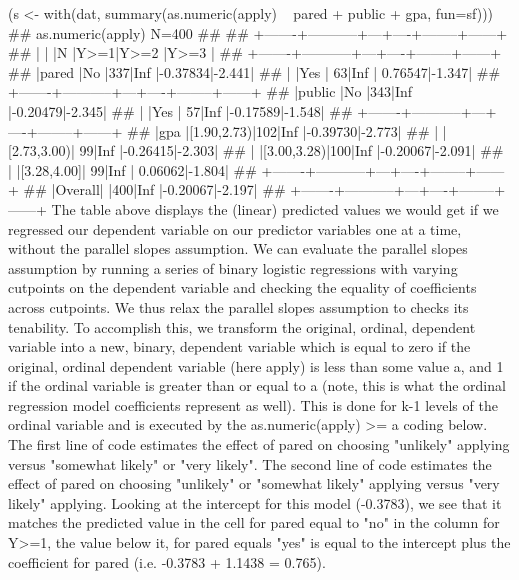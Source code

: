 \documentclass[00-GLMregression.tex]{subfiles}
\begin{document}
(s <- with(dat, summary(as.numeric(apply) ~ pared + public + gpa, fun=sf)))
## as.numeric(apply)    N=400
## 
## +-------+-----------+---+----+--------+------+
## |       |           |N  |Y>=1|Y>=2    |Y>=3  |
## +-------+-----------+---+----+--------+------+
## |pared  |No         |337|Inf |-0.37834|-2.441|
## |       |Yes        | 63|Inf | 0.76547|-1.347|
## +-------+-----------+---+----+--------+------+
## |public |No         |343|Inf |-0.20479|-2.345|
## |       |Yes        | 57|Inf |-0.17589|-1.548|
## +-------+-----------+---+----+--------+------+
## |gpa    |[1.90,2.73)|102|Inf |-0.39730|-2.773|
## |       |[2.73,3.00)| 99|Inf |-0.26415|-2.303|
## |       |[3.00,3.28)|100|Inf |-0.20067|-2.091|
## |       |[3.28,4.00]| 99|Inf | 0.06062|-1.804|
## +-------+-----------+---+----+--------+------+
## |Overall|           |400|Inf |-0.20067|-2.197|
## +-------+-----------+---+----+--------+------+
The table above displays the (linear) predicted values we would get if we regressed our dependent variable on our predictor variables one at a time, without the parallel slopes assumption. We can evaluate the parallel slopes assumption by running a series of binary logistic regressions with varying cutpoints on the dependent variable and checking the equality of coefficients across cutpoints. We thus relax the parallel slopes assumption to checks its tenability. To accomplish this, we transform the original, ordinal, dependent variable into a new, binary, dependent variable which is equal to zero if the original, ordinal dependent variable (here apply) is less than some value a, and 1 if the ordinal variable is greater than or equal to a (note, this is what the ordinal regression model coefficients represent as well). This is done for k-1 levels of the ordinal variable and is executed by the as.numeric(apply) >= a coding below. The first line of code estimates the effect of pared on choosing "unlikely" applying versus "somewhat likely" or "very likely". The second line of code estimates the effect of pared on choosing "unlikely" or "somewhat likely" applying versus "very likely" applying. Looking at the intercept for this model (-0.3783), we see that it matches the predicted value in the cell for pared equal to "no" in the column for Y>=1, the value below it, for pared equals "yes" is equal to the intercept plus the coefficient for pared (i.e. -0.3783 + 1.1438 = 0.765).
\end{document}
